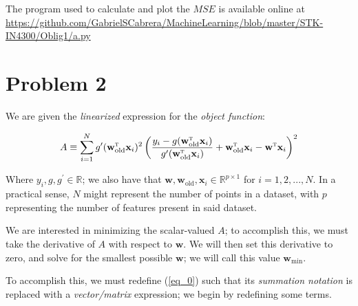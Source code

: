 \documentclass[a4paper,10pt,english]{article}
\begin{document}
\begin{multicols*}{2}
The program used to calculate and plot the $MSE$ is available online at \url{https://github.com/GabrielSCabrera/MachineLearning/blob/master/STK-IN4300/Oblig1/a.py}

\section*{Problem 2}

We are given the \textit{linearized} expression for the \textit{object function}:

\begin{equation}
\label{eq_0}
A \equiv \sum_{i=1}^{N} g^\prime(\mathbf{w}_\text{old}^\textsc{t} \mathbf{x}_i)^2 \left( \frac{y_i - g(\mathbf{w}_\text{old}^\textsc{t} \mathbf{x}_i)}{g^\prime(\mathbf{w}_\text{old}^\textsc{t} \mathbf{x}_i)} + \mathbf{w}_\text{old}^\textsc{t} \mathbf{x}_i - \mathbf{w}^\textsc{t} \mathbf{x}_i \right)^2
\end{equation}

Where $y_i, g, g^\prime \in \mathbb{R}$; we also have that $\mathbf{w}, \mathbf{w}_\text{old}, \mathbf{x}_i \in \mathbb{R}^{p \times 1}$ for $i = 1,2,...,N$.  In a practical sense, $N$ might represent the number of points in a dataset, with $p$ representing the number of features present in said dataset.

We are interested in minimizing the scalar-valued $A$; to accomplish this, we must take the derivative of $A$ with respect to $\mathbf{w}$. We will then set this derivative to zero, and solve for the smallest possible $\mathbf{w}$; we will call this value $\mathbf{w}_\text{min}$.

To accomplish this, we must redefine (\ref{eq_0}) such that its \textit{summation notation} is replaced with a \textit{vector/matrix} expression; we begin by redefining some terms.  


\end{multicols*}
\end{document}
